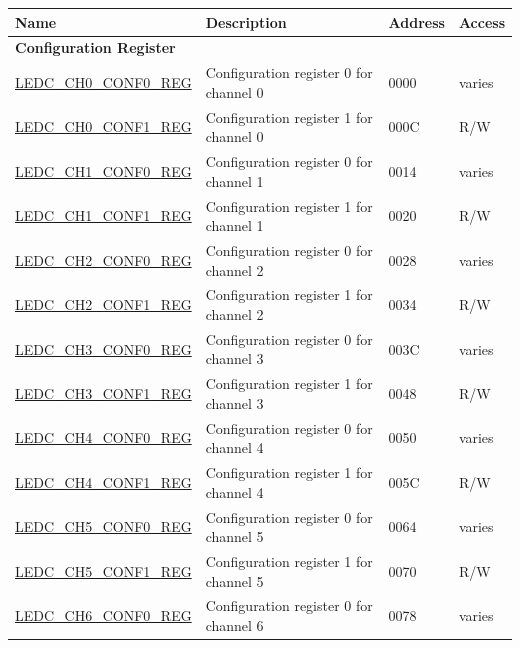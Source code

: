 \begin{longtable}{ | p{6cm} | p{7.2cm} | p{1.3cm} | p{1cm} | }
\hline\rowcolor{lightgray}
Name & Description &  Address & Access \\ \hline
\endhead
\multicolumn{4}{|l|}{\textbf{Configuration Register}} \\ \hline
\hyperref[regdesc:LEDCCHNCONF0REG]{LEDC\_CH0\_CONF0\_REG} & Configuration register 0 for channel 0 & \hexprefix{}0000 & varies \\ \hline
\hyperref[regdesc:LEDCCHNCONF1REG]{LEDC\_CH0\_CONF1\_REG} & Configuration register 1 for channel 0 & \hexprefix{}000C & R/W \\ \hline
\hyperref[regdesc:LEDCCHNCONF0REG]{LEDC\_CH1\_CONF0\_REG} & Configuration register 0 for channel 1 & \hexprefix{}0014 & varies \\ \hline
\hyperref[regdesc:LEDCCHNCONF1REG]{LEDC\_CH1\_CONF1\_REG} & Configuration register 1 for channel 1 & \hexprefix{}0020 & R/W \\ \hline
\hyperref[regdesc:LEDCCHNCONF0REG]{LEDC\_CH2\_CONF0\_REG} & Configuration register 0 for channel 2 & \hexprefix{}0028 & varies \\ \hline
\hyperref[regdesc:LEDCCHNCONF1REG]{LEDC\_CH2\_CONF1\_REG} & Configuration register 1 for channel 2 & \hexprefix{}0034 & R/W \\ \hline
\hyperref[regdesc:LEDCCHNCONF0REG]{LEDC\_CH3\_CONF0\_REG} & Configuration register 0 for channel 3 & \hexprefix{}003C & varies \\ \hline
\hyperref[regdesc:LEDCCHNCONF1REG]{LEDC\_CH3\_CONF1\_REG} & Configuration register 1 for channel 3 & \hexprefix{}0048 & R/W \\ \hline
\hyperref[regdesc:LEDCCHNCONF0REG]{LEDC\_CH4\_CONF0\_REG} & Configuration register 0 for channel 4 & \hexprefix{}0050 & varies \\ \hline
\hyperref[regdesc:LEDCCHNCONF1REG]{LEDC\_CH4\_CONF1\_REG} & Configuration register 1 for channel 4 & \hexprefix{}005C & R/W \\ \hline
\hyperref[regdesc:LEDCCHNCONF0REG]{LEDC\_CH5\_CONF0\_REG} & Configuration register 0 for channel 5 & \hexprefix{}0064 & varies \\ \hline
\hyperref[regdesc:LEDCCHNCONF1REG]{LEDC\_CH5\_CONF1\_REG} & Configuration register 1 for channel 5 & \hexprefix{}0070 & R/W \\ \hline
\hyperref[regdesc:LEDCCHNCONF0REG]{LEDC\_CH6\_CONF0\_REG} & Configuration register 0 for channel 6 & \hexprefix{}0078 & varies \\ \hline

\end{longtable}

